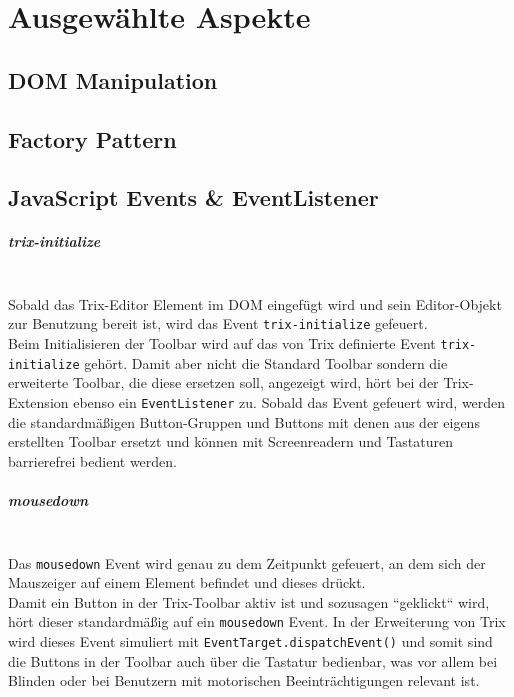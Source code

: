 \chapter{Ausgewählte Aspekte}
\section{DOM Manipulation}

\section{Factory Pattern}

\section{JavaScript Events \& EventListener}
\paragraph{trix-initialize}\mbox{}\\
Sobald das Trix-Editor Element im DOM eingefügt wird und sein Editor-Objekt zur Benutzung bereit ist, wird das Event \texttt{trix-initialize} gefeuert.\\
Beim Initialisieren der Toolbar wird auf das von Trix definierte Event \texttt{trix-initialize} gehört. Damit aber nicht die Standard Toolbar sondern die erweiterte Toolbar, die diese ersetzen soll, angezeigt wird, hört bei der Trix-Extension ebenso ein \texttt{EventListener} zu. Sobald das Event gefeuert wird, werden die standardmäßigen Button-Gruppen und Buttons mit denen aus der eigens erstellten Toolbar ersetzt und können mit Screenreadern und Tastaturen barrierefrei bedient werden.

\paragraph{mousedown}\mbox{}\\
Das \texttt{mousedown} Event wird genau zu dem Zeitpunkt gefeuert, an dem sich der Mauszeiger auf einem Element befindet und dieses drückt.\\
Damit ein Button in der Trix-Toolbar aktiv ist und sozusagen ``geklickt`` wird, hört dieser standardmäßig auf ein \texttt{mousedown} Event. In der Erweiterung von Trix wird dieses Event simuliert mit \texttt{EventTarget.dispatchEvent()} und somit sind die Buttons in der Toolbar auch über die Tastatur bedienbar, was vor allem bei Blinden oder bei Benutzern mit motorischen Beeinträchtigungen relevant ist.

